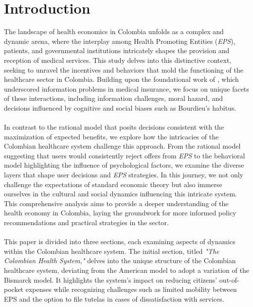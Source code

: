 \documentclass[12pt]{article}
\begin{document}
\section*{Introduction}
\begin{flushleft}

    The landscape of health economics in Colombia unfolds as a complex and dynamic arena, where the interplay among Health Promoting Entities (\textit{EPS}), patients, and governmental institutions intricately shapes the provision and reception of medical services. This study delves into this distinctive context, seeking to unravel the incentives and behaviors that mold the functioning of the healthcare sector in Colombia. Building upon the foundational work of \citet{arrow1963uncertainty}, which underscored information problems in medical insurance, we focus on unique facets of these interactions, including information challenges, moral hazard, and decisions influenced by cognitive and social biases such as Bourdieu's habitus.\\~\\

    In contrast to the rational model that posits decisions consistent with the maximization of expected benefits, we explore how the intricacies of the Colombian healthcare system challenge this approach. From the rational model suggesting that users would consistently reject offers from \textit{EPS} to the behavioral model highlighting the influence of psychological factors, we examine the diverse layers that shape user decisions and \textit{EPS} strategies. In this journey, we not only challenge the expectations of standard economic theory but also immerse ourselves in the cultural and social dynamics influencing this intricate system. This comprehensive analysis aims to provide a deeper understanding of the health economy in Colombia, laying the groundwork for more informed policy recommendations and practical strategies in the sector.\\~\\

    This paper is divided into three sections, each examining aspects of dynamics within the Colombian healthcare system. The initial section, titled \textit{"The Colombian Health System,"} delves into the unique structure of the Colombian healthcare system, deviating from the American model to adopt a variation of the Bismarck model. It highlights the system's impact on reducing citizens' out-of-pocket expenses while recognizing challenges such as limited mobility between EPS and the option to file tutelas in cases of dissatisfaction with services.\\~\\


\end{flushleft}
\end{document}
